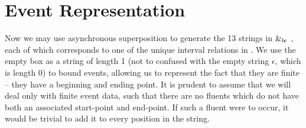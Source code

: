 \documentclass[a4paper,11pt]{article}
\newcommand{\bc}{{\rm b\!c}}
\newcommand{\vph}[1]{\vphantom{#1}}
\begin{document}
\section{Event Representation}
Now we may use asynchronous superposition to generate the 13 strings in 
\fbox{\vph{$e'$}}\fbox{$e\vph{e'}$}\fbox{\vph{$e'$}} 
$\&_{\bc}$ 
\fbox{\vph{$e'$}}\fbox{\vph{$e'$}}, each of which corresponds to one 
of the unique interval relations in \cite{allen1983maintaining}.
We use the empty box \fbox{$\vph{'}$} as a string of length 1 (not to confused 
with the empty string $\epsilon$, which is length 0) to bound events, allowing 
us to represent the fact that they are finite -- they have a beginning and 
ending point. It is prudent to assume that we will deal only with finite event 
data, such that there are no fluents which do not have both an associated 
start-point and end-point. If such a fluent were to occur, it would be trivial 
to add it to every position in the string. 
\end{document}
